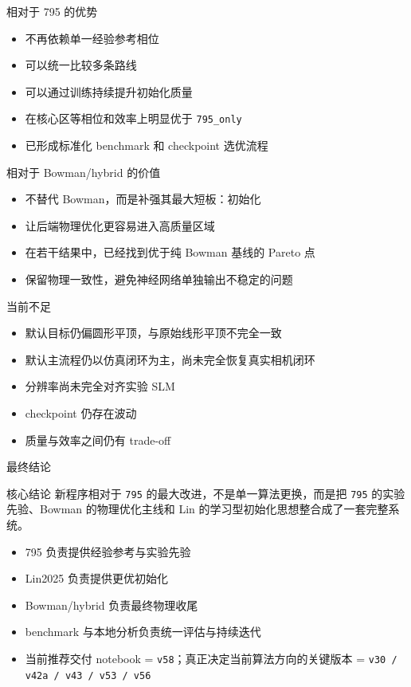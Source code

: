 \documentclass[aspectratio=169,10pt]{ctexbeamer}
\begin{document}
\begin{frame}{相对于 795 的优势}
  \begin{itemize}
    \item 不再依赖单一经验参考相位
    \item 可以统一比较多条路线
    \item 可以通过训练持续提升初始化质量
    \item 在核心区等相位和效率上明显优于 \texttt{795\_only}
    \item 已形成标准化 benchmark 和 checkpoint 选优流程
  \end{itemize}
\end{frame}

\begin{frame}{相对于 Bowman/hybrid 的价值}
  \begin{itemize}
    \item 不替代 Bowman，而是补强其最大短板：初始化
    \item 让后端物理优化更容易进入高质量区域
    \item 在若干结果中，已经找到优于纯 Bowman 基线的 Pareto 点
    \item 保留物理一致性，避免神经网络单独输出不稳定的问题
  \end{itemize}
\end{frame}

\begin{frame}{当前不足}
  \begin{itemize}
    \item 默认目标仍偏圆形平顶，与原始线形平顶不完全一致
    \item 默认主流程仍以仿真闭环为主，尚未完全恢复真实相机闭环
    \item 分辨率尚未完全对齐实验 SLM
    \item checkpoint 仍存在波动
    \item 质量与效率之间仍有 trade-off
  \end{itemize}
\end{frame}

\begin{frame}{最终结论}
  \begin{block}{核心结论}
    新程序相对于 \texttt{795} 的最大改进，不是单一算法更换，而是把 \texttt{795} 的实验先验、Bowman 的物理优化主线和 Lin 的学习型初始化思想整合成了一套完整系统。
  \end{block}

  \begin{itemize}
    \item 795 负责提供经验参考与实验先验
    \item Lin2025 负责提供更优初始化
    \item Bowman/hybrid 负责最终物理收尾
    \item benchmark 与本地分析负责统一评估与持续迭代
    \item 当前推荐交付 notebook = \texttt{v58}；真正决定当前算法方向的关键版本 = \texttt{v30 / v42a / v43 / v53 / v56}
  \end{itemize}
\end{frame}
\end{document}
